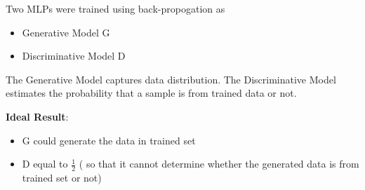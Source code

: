 Two MLPs were trained using back-propogation as
\begin{itemize}
    \item Generative Model G
    \item Discriminative Model D
\end{itemize}

The Generative Model captures data distribution.
The Discriminative Model estimates the probability that a sample is from trained data or not.

\textbf{Ideal Result}:
\begin{itemize}
    \item G could generate the data in trained set
    \item D equal to $\frac{1}{2}$ ( so that it cannot determine whether the generated data is from trained set or not)
\end{itemize}